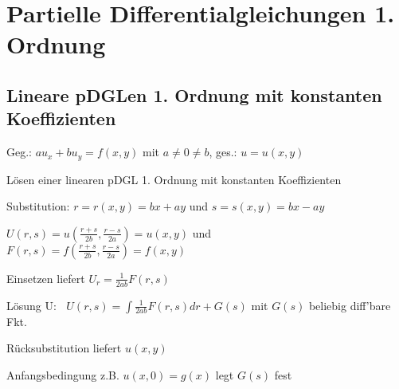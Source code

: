 \documentclass[german,color,5pt]{latex4ei/latex4ei_fs}
\begin{document}
\section{Partielle Differentialgleichungen 1. Ordnung}

\begin{sectionbox}
	\subsection{Lineare pDGLen 1. Ordnung mit konstanten Koeffizienten}
	Geg.: $a u_x+b u_y =f(x,y)$ mit $a \neq 0 \neq b$, ges.: $u=u(x,y)$
	\begin{cookbox}{Lösen einer linearen pDGL 1. Ordnung mit konstanten Koeffizienten}
		\item Substitution: $r=r(x,y)=bx+ay$ und $s=s(x,y)=bx-ay$
		\item $U(r,s) = u(\frac{r+s}{2b},\frac{r-s}{2a}) = u(x,y)$  und \\ $F(r,s) = f(\frac{r+s}{2b},\frac{r-s}{2a}) = f(x,y)$
		\item Einsetzen liefert $U_{r}=\frac{1}{2ab}F(r,s) $
		\item Lösung U: $\; \; U(r,s)=\int \frac{1}{2ab} F(r,s)dr+G(s)$ mit $G(s)$ beliebig diff'bare Fkt.
		\item Rücksubstitution liefert $u(x,y)$
		\item Anfangsbedingung z.B. $u(x,0) = g(x)$ legt $G(s)$ fest
	\end{cookbox}
\end{sectionbox}
\end{document}
